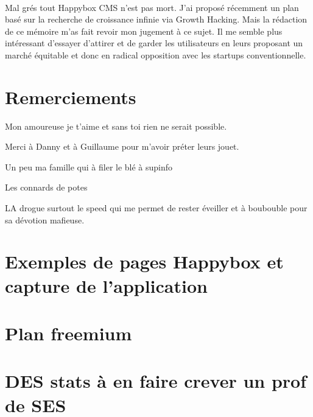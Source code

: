\documentclass[11pt, a4paper ]{article}
\let\stdsection\section
\renewcommand\section{\newpage\stdsection}
\begin{document}
\begin{spacing}{1.5}
\paragraph{}
Mal grés tout Happybox CMS n'est pas mort. J'ai proposé récemment un plan basé sur la recherche de croissance infinie via Growth Hacking. Mais la rédaction de ce mémoire m'as fait revoir mon jugement à ce sujet.
Il me semble plus intéressant d'essayer d'attirer et de garder les utilisateurs en leurs proposant un marché équitable et donc en radical opposition avec les startups conventionnelle.

\paragraph{}


\section{Remerciements}

		Mon amoureuse je t'aime et sans toi rien ne serait possible.

		Merci à Danny et à Guillaume pour m'avoir préter leurs jouet.

		Un peu ma famille qui à filer le blé à supinfo

		Les connards de potes

		LA drogue surtout le speed qui me permet de rester éveiller et à boubouble pour sa dévotion mafieuse.


	\appendix
	\section{Exemples de pages Happybox et capture de l'application}

	\section{Plan freemium}

	\section{DES stats à en faire crever un prof de SES}

	\printindex

	
	
\end{spacing}
\end{document}
